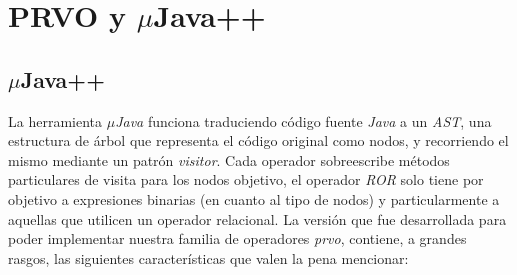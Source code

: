 \chapter[Implementaci\'on]{PRVO y $\mu$Java++}
\label{sec:implementation}

\section{$\mu$Java++}

La herramienta \emph{$\mu$Java} \cite{bibliography.mutation.tools.muJavaMaOK05} funciona traduciendo c\'odigo fuente \emph{Java} a un \emph{AST}, una estructura de \'arbol que representa el c\'odigo original como nodos, y recorriendo el mismo mediante un patr\'on \emph{visitor}. Cada operador sobreescribe m\'etodos particulares de visita para los nodos objetivo, el operador \emph{ROR} solo tiene por objetivo a expresiones binarias (en cuanto al tipo de nodos) y particularmente a aquellas que utilicen un operador relacional. La versi\'on que fue desarrollada para poder implementar nuestra familia de operadores \emph{prvo}, contiene, a grandes rasgos, las siguientes caracter\'isticas que valen la pena mencionar:


